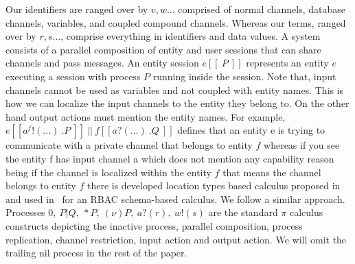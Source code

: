 Our identifiers are ranged %
over by  $ v, w \dots$ comprised of normal channels, database channels, variables, and coupled compound channels. Whereas our terms, ranged over by $ r, s \dots$, comprise everything in identifiers and data values. 
A system consists of a parallel composition of entity and user sessions that can share channels and pass messages. An entity session  $  e[\![  \ P \  ]\!] $   represents an entity $ \textit{e}$ executing a session with process $P$ running inside the session. 
 Note that, input channels cannot be used as variables and not coupled with entity names. This is how we can localize the input channels to the entity they belong to. On the other hand output actions must mention the entity names. For example, $  e[\![ a^f!( ... ) \ .P \  ]\!]  \  || \ f[\![ a?( ... ) \ .Q \  ]\!] $ defines that an entity e is trying to communicate with a private channel that belongs to entity $ f$ whereas if you see the entity f has input channel a which does not mention any capability reason being if the channel is localized within the entity $ f$ that means the channel belongs to entity $ f$ there is developed location types based calculus proposed %
 in~\cite{hennessy02toplas%
 } and used %
 in~\cite{braghin2004distributed} for an RBAC schema-based calculus.  We follow a similar approach. Processes $ 0, \ P|Q, \ *P, \ (\nu)P , \ a?(r),\  w! (s)  $ are the standard $ \pi$ calculus constructs depicting the inactive process, parallel composition, process replication, channel restriction, input action and output action. We will omit the trailing nil process in the rest of the paper. 

